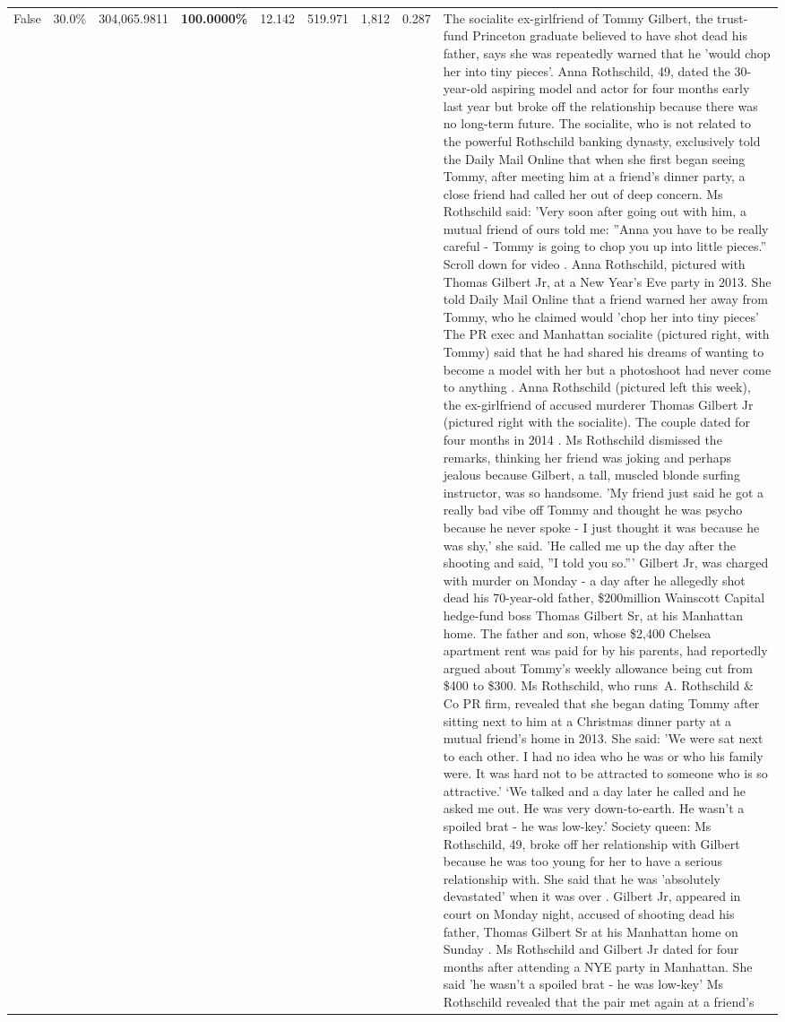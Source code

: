 \begin{table}[H]
\begin{tabular}{lllrlllll}
False & 30.0\% & \color{red} 304,065.9811 & \bfseries \color{red} 100.0000\% & 12.142 & 519.971 & 1,812 & 0.287 & The socialite ex-girlfriend of Tommy Gilbert, the trust-fund Princeton graduate believed to have shot dead his father, says she was repeatedly warned that he 'would chop her into tiny pieces'. Anna Rothschild, 49, dated the 30-year-old aspiring model and actor for four months early last year but broke off the relationship because there was no long-term future. The socialite, who is not related to the powerful Rothschild banking dynasty, exclusively told the Daily Mail Online that when she first began seeing Tommy, after meeting him at a friend's dinner party, a close friend had called her out of deep concern. Ms Rothschild said: 'Very soon after going out with him, a mutual friend of ours told me: ''Anna you have to be really careful - Tommy is going to chop you up into little pieces.'' Scroll down for video . Anna Rothschild, pictured with Thomas Gilbert Jr, at a New Year's Eve party in 2013. She told Daily Mail Online that a friend warned her away from Tommy, who he claimed would 'chop her into tiny pieces' The PR exec and Manhattan socialite (pictured right, with Tommy) said that he had shared his dreams of wanting to become a model with her but a photoshoot had never come to anything . Anna Rothschild (pictured left this week), the ex-girlfriend of accused murderer Thomas Gilbert Jr (pictured right with the socialite). The couple dated for four months in 2014 . Ms Rothschild dismissed the remarks, thinking her friend was joking and perhaps jealous because Gilbert, a tall, muscled blonde surfing instructor, was so handsome. 'My friend just said he got a really bad vibe off Tommy and thought he was psycho because he never spoke - I just thought it was because he was shy,' she said. 'He called me up the day after the shooting and said, ''I told you so.''' Gilbert Jr, was charged with murder on Monday - a day after he allegedly shot dead his 70-year-old father, \$200million Wainscott Capital hedge-fund boss Thomas Gilbert Sr, at his Manhattan home. The father and son, whose \$2,400 Chelsea apartment rent was paid for by his parents, had reportedly argued about Tommy's weekly allowance being cut from \$400 to \$300. Ms Rothschild, who runs A. Rothschild \& Co PR firm, revealed that she began dating Tommy after sitting next to him at a Christmas dinner party at a mutual friend's home in 2013. She said: 'We were sat next to each other. I had no idea who he was or who his family were. It was hard not to be attracted to someone who is so attractive.' ‘We talked and a day later he called and he asked me out. He was very down-to-earth. He wasn’t a spoiled brat - he was low-key.’ Society queen: Ms Rothschild, 49, broke off her relationship with Gilbert because he was too young for her to have a serious relationship with. She said that he was 'absolutely devastated' when it was over . Gilbert Jr, appeared in court on Monday night, accused of shooting dead his father, Thomas Gilbert Sr at his Manhattan home on Sunday . Ms Rothschild and Gilbert Jr dated for four months after attending a NYE party in Manhattan. She said 'he wasn't a spoiled brat - he was low-key' Ms Rothschild revealed that the pair met again at a friend’s 
\end{tabular}
\end{table}
